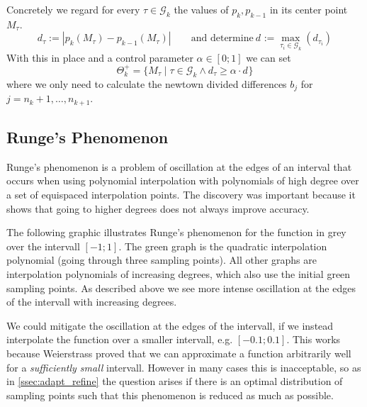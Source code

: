 \begin{center}
   
\end{center}

Concretely we regard for every \(\tau \in \mathcal{G}_k\) the values of \(p_k, p_{k-1}\) in its center point \(M_{\tau}\).
\[d_{\tau} := |p_k(M_{\tau}) - p_{k-1}(M_{\tau})| \qquad\text{and determine}~d_{} := \max_{\tau_i \in \mathcal{G}_k}(d_{\tau_i})\]
With this in place and a control parameter \(\alpha \in [0; 1]\) we can set
\[\Theta_k^+ = \{M_{\tau} \mid \tau \in \mathcal{G}_k \land d_{\tau} \geq \alpha \cdot d_{}\}\]
where we only need to calculate the newtown divided differences \(b_j\) for \(j = n_k + 1, \ldots, n_{k+1}\).



\subsection{Runge's Phenomenon}
Runge's phenomenon is a problem of oscillation at the edges of an interval that occurs when using polynomial interpolation with polynomials of high degree over a set of equispaced interpolation points.
The discovery was important because it shows that going to higher degrees does not always improve accuracy.

The following graphic illustrates Runge's phenomenon for the function in grey over the intervall \([-1; 1]\).
The green graph is the quadratic interpolation polynomial (going through three sampling points).
All other graphs are interpolation polynomials of increasing degrees, which also use the initial green sampling points.
As described above we see more intense oscillation at the edges of the intervall with increasing degrees.

\begin{center}
   
\end{center}

We could mitigate the oscillation at the edges of the intervall, if we instead interpolate the function over a smaller intervall, e.g. \([-0.1; 0.1]\).
This works because Weierstrass proved that we can approximate a function arbitrarily well for a \emph{sufficiently small} intervall.
However in many cases this is inacceptable, so as in \cref{ssec:adapt_refine} the question arises if there is an optimal distribution of sampling points such that this phenomenon is reduced as much as possible.

